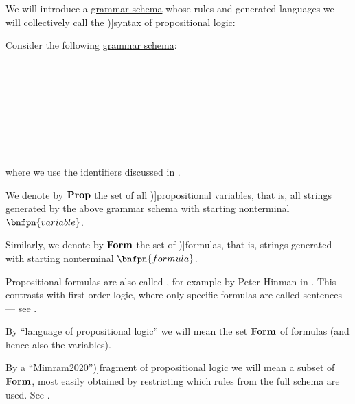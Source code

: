 \begin{definition}\label{def:propositional_syntax}\mimprovised
  We will introduce a \hyperref[def:formal_grammar/schema]{grammar schema} whose rules and generated languages we will collectively call the \term[en=syntax (\cite[8]{Hinman2005})]{syntax} of propositional logic:
  \begin{thmenum}
     Consider the following \hyperref[def:formal_grammar/schema]{grammar schema}:
    \begin{bnf*}
       \\
          {} \\
        {\bnftsq{\( \synvee \)} \bnfor \bnftsq{\( \synwedge \)} \bnfor \bnftsq{\( \synimplies \)}\bnfor \bnftsq{\( \syniff \)}} \\
       \\
           {\bnftsq{\( \syntop \)} \bnfor \bnftsq{\( \synbot \)} \bnfor} \\
       \\
       \\
    \end{bnf*}
    where we use the identifiers discussed in .

     We denote by \( \op*{Prop} \) the set of all \term[ru=пропозициональные переменные (\cite[43]{КолмогоровДрагалин2006})]{propositional variables}, that is, all strings generated by the above grammar schema with starting nonterminal \( \bnfpn{variable} \).

     Similarly, we denote by \( \op*{Form} \) the set of \term[ru=формула (\cite[43]{КолмогоровДрагалин2006})]{formulas}, that is, strings generated with starting nonterminal \( \bnfpn{formula} \).

    Propositional formulas are also called , for example by Peter Hinman in . This contrasts with first-order logic, where only specific formulas are called sentences --- see .

     By \enquote{language of propositional logic} we will mean the set \( \op*{Form} \) of formulas (and hence also the variables).

     By a \enquote[en=fragment (\cite[49]{Mimram2020})]{fragment} of propositional logic we will mean a subset of \( \op*{Form} \), most easily obtained by restricting which rules from the full schema are used. See .
  \end{thmenum}
\end{definition}
